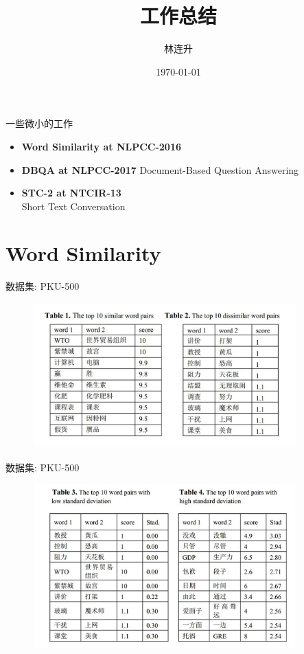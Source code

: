 \documentclass{beamer}
\title{工作总结}
\date{\today}
\author{林连升}
\begin{document}
  \maketitle

  \begin{frame}{一些微小的工作}
    \begin{itemize}
    \item \textbf{Word Similarity at NLPCC-2016} \newline
    \item \textbf{DBQA at NLPCC-2017} \newline
      Document-Based Question Answering
    \item \textbf{STC-2 at NTCIR-13} \\
      Short Text Conversation
    \end{itemize}
    \end{frame}
  \section{Word Similarity}

    \begin{frame}{数据集: PKU-500}
    \begin{center}
      \begin{figure}
      \includegraphics[width=4in,height=2.2in]{pku-500-1.jpg}
      \end{figure}
      \end{center}
    \end{frame}

    \begin{frame}{数据集: PKU-500}
    \begin{center}
      \begin{figure}
      \includegraphics[width=4in,height=2.5in]{pku-500-2.jpg}
      \end{figure}
      \end{center}
    \end{frame}
\end{document}
